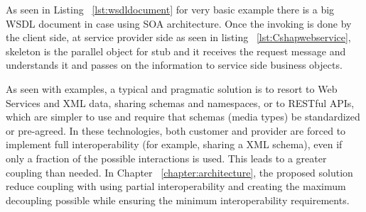 As seen in Listing ~\ref{lst:wsdldocument} for very basic example there is a big WSDL document in case using SOA architecture. Once the invoking is done by the client side, at service provider side as seen in listing ~\ref{lst:Cshapwebservice}, skeleton is the parallel object for stub and it receives the request message and understands it and passes on the information to service side business objects.


As seen with examples, a typical and pragmatic solution is to resort to Web Services and XML data, sharing schemas and namespaces, or to RESTful APIs, which are simpler to use and require that schemas (media types) be standardized or pre-agreed. In these technologies, both customer and provider are forced to implement full interoperability (for example, sharing a XML schema), even if only a fraction of the possible interactions is used. This leads to a greater coupling than needed. In Chapter ~\ref{chapter:architecture}, the proposed solution  reduce coupling with using partial interoperability and creating the maximum decoupling possible while ensuring the minimum interoperability requirements.
